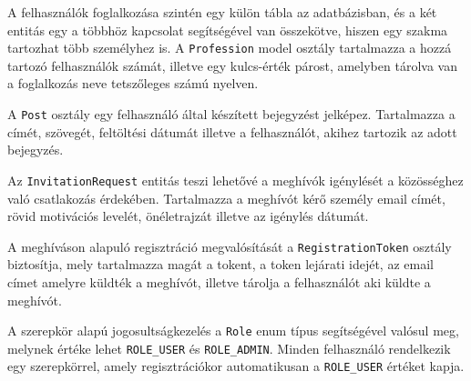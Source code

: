 A felhasználók foglalkozása szintén egy külön tábla az adatbázisban, és a két entitás egy a többhöz kapcsolat segítségével van összekötve, hiszen egy szakma tartozhat több személyhez is. A \texttt{Profession} model osztály tartalmazza a hozzá tartozó felhasználók számát, illetve egy kulcs-érték párost, amelyben tárolva van a foglalkozás neve tetszőleges számú nyelven.

A \texttt{Post} osztály egy felhasználó által készített bejegyzést jelképez. Tartalmazza a címét, szövegét, feltöltési dátumát illetve a felhasználót, akihez tartozik az adott bejegyzés.

Az \texttt{InvitationRequest} entitás teszi lehetővé a meghívók igénylését a közösséghez való csatlakozás érdekében. Tartalmazza  a meghívót kérő személy email címét, rövid motivációs levelét, önéletrajzát illetve az igénylés dátumát. 

A meghíváson alapuló regisztráció megvalósítását a \texttt{RegistrationToken} osztály biztosítja, mely tartalmazza magát a tokent, a token lejárati idejét, az email címet amelyre küldték a meghívót, illetve tárolja a felhasználót aki küldte a meghívót. 

A szerepkör alapú jogosultságkezelés a \texttt{Role} enum típus segítségével valósul meg, melynek értéke lehet \texttt{ROLE\_USER} és \texttt{ROLE\_ADMIN}. Minden felhasználó rendelkezik egy szerepkörrel, amely regisztrációkor automatikusan a \texttt{ROLE\_USER} értéket kapja. 

